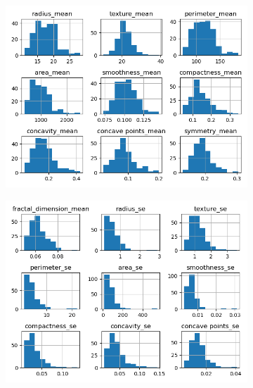 \begin{figure}[H]
     \centering
     \begin{subfigure}[b]{0.3\textwidth}
 \centering
\includegraphics[scale=0.3]{images/hist_cancer_yes_1.png}
     \end{subfigure}
     \hfill
     \begin{subfigure}[b]{0.3\textwidth}
         \centering
 \centering
\includegraphics[scale=0.3]{images/hist_cancer_yes_2.png}
     \end{subfigure}
     \hfill
     \begin{subfigure}[b]{0.3\textwidth}
 \centering

\end{subfigure}
\end{figure}
